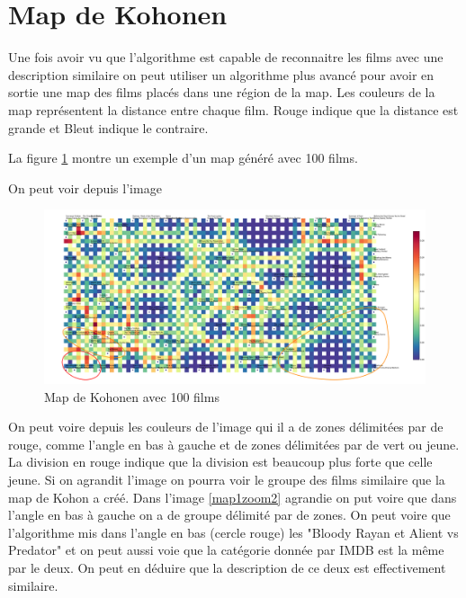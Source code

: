 \section{Map de Kohonen}

Une fois avoir vu que l'algorithme est capable de reconnaitre les films avec une description similaire on peut utiliser un algorithme plus avancé pour avoir en sortie une map des films placés dans une région de la map. Les couleurs de la map représentent la distance entre chaque film. Rouge indique que la distance est grande et Bleut indique le contraire.

La figure \ref{map1} montre un exemple d'un map généré avec 100 films.

On peut voir depuis l'image
\begin{figure}[h]
	\centering
	\includegraphics[width=1\linewidth]{img/map-cluster.png}
	\caption{Map de Kohonen avec 100 films}
	\label{map1}
\end{figure}

On peut voire depuis les couleurs de l'image qui il a de zones délimitées par de rouge, comme l'angle en bas à gauche et de zones délimitées par de vert ou jeune. La division en rouge indique que la division est beaucoup plus forte que celle jeune. Si on agrandit l'image on pourra voir le groupe des films similaire que la map de Kohon a créé.
Dans l'image \ref{map1zoom2} agrandie on put voire que dans l'angle en bas à gauche on a de groupe délimité par de zones. On peut voire que l'algorithme mis dans l'angle en bas (cercle rouge) les "Bloody Rayan et Alient vs Predator" et on peut aussi voie que la catégorie donnée par IMDB est la même par le deux. On peut en déduire que la description de ce deux est effectivement similaire.


